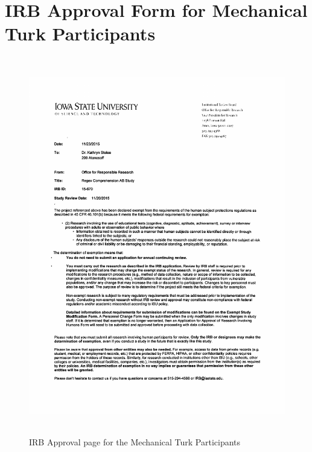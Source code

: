 \section*{IRB Approval Form for Mechanical Turk Participants}
\label{app:IRBMT}

\begin{figure}[!htbp]
   \centering
       \includegraphics[page=1, height=16.5cm,keepaspectratio]{nontex/appendix/15-670_Approved}
 \caption{IRB Approval page for the Mechanical Turk Participants}
 \label{fig:MTIRB}
\end{figure}

